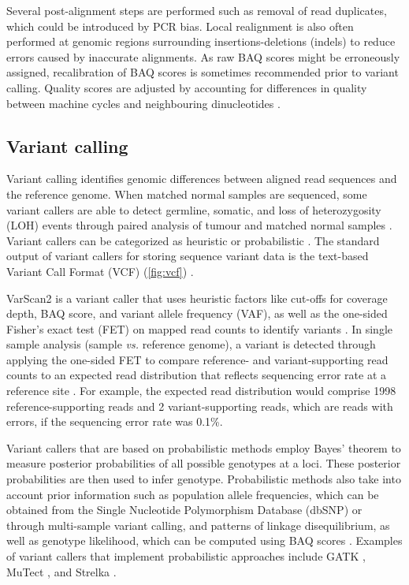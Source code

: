 Several post-alignment steps are performed such as removal of read duplicates, which could be introduced by PCR bias. Local realignment is also often performed at genomic regions surrounding insertions-deletions (indels) to reduce errors caused by inaccurate alignments. As raw BAQ scores might be erroneously assigned, recalibration of BAQ scores is sometimes recommended prior to variant calling. Quality scores are adjusted by accounting for differences in quality between machine cycles and neighbouring dinucleotides \cite{Bao2014, Mielczarek2016, Nielsen2011a, Oliver2015}.

\subsection{Variant calling}

Variant calling identifies genomic differences between aligned read sequences and the reference genome. When matched normal samples are sequenced, some variant callers are able to detect germline, somatic, and loss of heterozygosity (\acs{LOH}) events through paired analysis of tumour and matched normal samples \cite{Koboldt2013}. Variant callers can be categorized as heuristic or probabilistic \cite{Mielczarek2016, Pabinger2014, Bao2014}. The standard output of variant callers for storing sequence variant data is the text-based Variant Call Format (\acs{VCF}) (\autoref{fig:vcf}) \cite{Danecek2011}.

VarScan2 is a variant caller that uses heuristic factors like cut-offs for coverage depth, BAQ score, and variant allele frequency (\acs{VAF}), as well as the one-sided Fisher's exact test (\acs{FET}) on mapped read counts to identify variants \cite{Bao2014, Pabinger2014, Mielczarek2016, Koboldt2013, Koboldt2012}. In single sample analysis (sample \textit{vs.} reference genome), a variant is detected through applying the one-sided FET to compare reference- and variant-supporting read counts to an expected read distribution that reflects sequencing error rate at a reference site \cite{Koboldt2013, Koboldt2012}. For example, the expected read distribution would comprise 1998 reference-supporting reads and 2 variant-supporting reads, which are reads with errors, if the sequencing error rate was 0.1\%.

Variant callers that are based on probabilistic methods employ Bayes' theorem to measure posterior probabilities of all possible genotypes at a loci. These posterior probabilities are then used to infer genotype. Probabilistic methods also take into account prior information such as population allele frequencies, which can be obtained from the Single Nucleotide Polymorphism Database (dbSNP) or through multi-sample variant calling, and patterns of linkage disequilibrium, as well as genotype likelihood, which can be computed using BAQ scores \cite{Mielczarek2016, Nielsen2011a}. Examples of variant callers that implement probabilistic approaches include GATK \cite{Schmidt2009}, MuTect \cite{Cibulskis2013}, and Strelka \cite{Saunders2012}.

